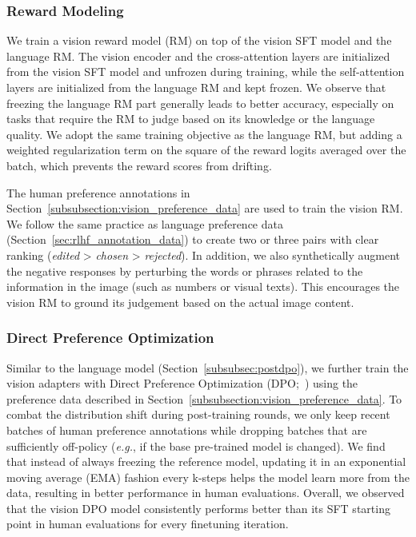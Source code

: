 \documentclass[dvipsnames]{fairmeta}
\begin{document}
\subsubsection{Reward Modeling}
\label{subsubsection:vision_reward_modeling}
We train a vision reward model (RM) on top of the vision SFT model and the language RM. The vision encoder and the cross-attention layers are initialized from the vision SFT model and unfrozen during training, while the self-attention layers are initialized from the language RM and kept frozen. We observe that freezing the language RM part generally leads to better accuracy, especially on tasks that require the RM to judge based on its knowledge or the language quality. We adopt the same training objective as the language RM, but adding a weighted regularization term on the square of the reward logits averaged over the batch, which prevents the reward scores from drifting.

The human preference annotations in Section~\ref{subsubsection:vision_preference_data} are used to train the vision RM. We follow the same practice as language preference data (Section~\ref{sec:rlhf_annotation_data}) to create two or three pairs with clear ranking (\emph{edited} > \emph{chosen} > \emph{rejected}). In addition, we also synthetically augment the negative responses by perturbing the words or phrases related to the information in the image (such as numbers or visual texts). This encourages the vision RM to ground its judgement based on the actual image content.

\subsubsection{Direct Preference Optimization}
\label{subsubsec:dpo}
Similar to the language model (Section~\ref{subsubsec:postdpo}), we further train the vision adapters with Direct Preference Optimization (DPO;~\cite{rafailov2023dpo}) using the preference data described in Section~\ref{subsubsection:vision_preference_data}. To combat the distribution shift during post-training rounds, we only keep recent batches of human preference annotations while dropping batches that are sufficiently off-policy (\textit{e.g.}, if the base pre-trained model is changed). We find that instead of always freezing the reference model, updating it in an exponential moving average (EMA) fashion every k-steps helps the model learn more from the data, resulting in better performance in human evaluations. Overall, we observed that the vision DPO model consistently performs better than its SFT starting point in human evaluations for every finetuning iteration.
\end{document}
